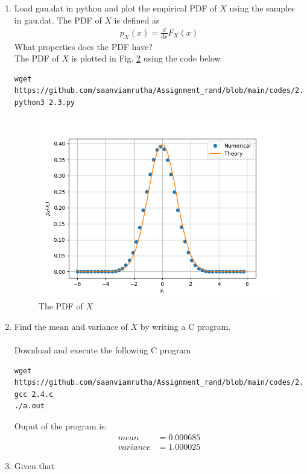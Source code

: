\documentclass[journal,12pt,twocolumn]{IEEEtran}
\renewcommand\thesection{\arabic{section}}
\begin{document}
\begin{enumerate}[label=\thesection.\arabic*
,ref=\thesection.\theenumi]
\begin{figure}
\caption{The CDF of $X$}
\label{fig:gauss_cdf}
\end{figure}
\item
Load gau.dat in python and plot the empirical PDF of $X$ using the samples in gau.dat. The PDF of $X$ is defined as
\begin{align}
p_{X}(x) = \frac{d}{dx}F_{X}(x)
\end{align}
What properties does the PDF have?
\\
\solution The PDF of $X$ is plotted in Fig. \ref{fig:gauss_pdf} using the code below
\begin{lstlisting}
wget https://github.com/saanviamrutha/Assignment_rand/blob/main/codes/2.3.py
python3 2.3.py
\end{lstlisting}
\begin{figure}
\centering
\includegraphics[width=\columnwidth]{figures/pdf.png}
\caption{The PDF of $X$}
\label{fig:gauss_pdf}
\end{figure}
\item Find the mean and variance of $X$ by writing a C program.
\\ \solution \\
Download and execute the following C program
\begin{lstlisting}
wget https://github.com/saanviamrutha/Assignment_rand/blob/main/codes/2.4.c
gcc 2.4.c
./a.out
\end{lstlisting}
Ouput of the program is:
\begin{align}
    mean&=0.000685 \\
    variance&=1.000025 
\end{align}
\item Given that 

\end{enumerate}
\end{document}
